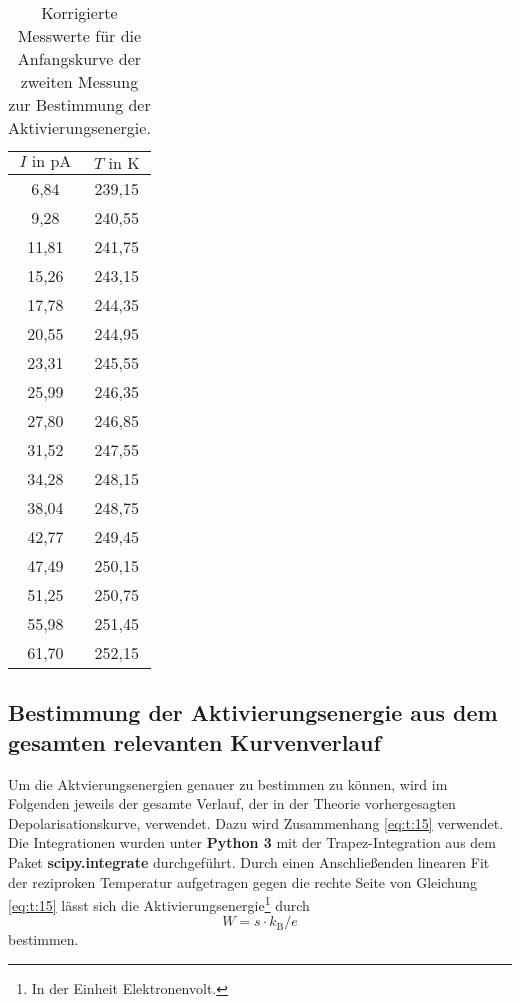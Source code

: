 \begin{table}
  \centering
  \caption{Korrigierte Messwerte für die Anfangskurve der zweiten Messung zur Bestimmung der Aktivierungsenergie.}
  \label{tab:linfit2}
  \begin{tabular}{c c}
    \toprule
    $I \text{ in } \si{\pico\ampere}$ & $ T \text{ in } \si{\kelvin} $ \\
    \midrule
     6,84 & 239,15\\
     9,28 & 240,55\\
    11,81 & 241,75\\
    15,26 & 243,15\\
    17,78 & 244,35\\
    20,55 & 244,95\\
    23,31 & 245,55\\
    25,99 & 246,35\\
    27,80 & 246,85\\
    31,52 & 247,55\\
    34,28 & 248,15\\
    38,04 & 248,75\\
    42,77 & 249,45\\
    47,49 & 250,15\\
    51,25 & 250,75\\
    55,98 & 251,45\\
    61,70 & 252,15\\
    \bottomrule
  \end{tabular}
\end{table}

\FloatBarrier


\subsection{Bestimmung der Aktivierungsenergie aus dem gesamten relevanten Kurvenverlauf}
\label{subsec:method2}

Um die Aktvierungsenergien genauer zu bestimmen zu können, wird im Folgenden jeweils der gesamte Verlauf, der in der Theorie vorhergesagten Depolarisationskurve,
verwendet. Dazu wird Zusammenhang \eqref{eq:t:15} verwendet. Die Integrationen wurden unter \textbf{Python 3} mit der Trapez-Integration aus dem Paket \textbf{scipy.integrate} durchgeführt.
Durch einen Anschließenden linearen Fit der reziproken Temperatur aufgetragen gegen die rechte Seite von Gleichung \eqref{eq:t:15} lässt sich die
Aktivierungsenergie\footnote{In der Einheit Elektronenvolt.} durch
\\
\begin{equation}
  \label{eqn:W2}
  W = s \cdot k_\text{B} / e
\end{equation}
bestimmen.


